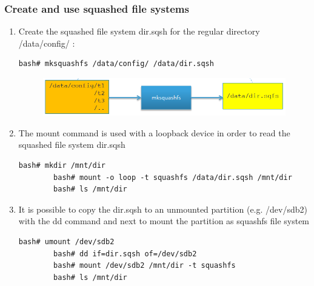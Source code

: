 \documentclass[resume]{subfiles}
\begin{document}
\subsubsection{Create and use squashed file systems}
\begin{enumerate}
    \item Create the squashed file system dir.sqsh for the regular directory /data/config/ :
    \begin{lstlisting}[style=console,label={},caption={}]
        bash# mksquashfs /data/config/ /data/dir.sqsh
    \end{lstlisting}
    \begin{figure}[H]
        \centering
        \includegraphics[width=0.75\columnwidth]{Figures/fileSystem/msquashfsCom.png}
        \label{fig:msquashfsCom}
    \end{figure}
    \item The mount command is used with a loopback device in order to read the squashed file system dir.sqsh
    \begin{lstlisting}[style=console,label={},caption={}]
        bash# mkdir /mnt/dir
        bash# mount -o loop -t squashfs /data/dir.sqsh /mnt/dir
        bash# ls /mnt/dir
    \end{lstlisting}
    \item It is possible to copy the dir.sqsh to an unmounted partition (e.g. /dev/sdb2) with the dd command and next to mount the partition as squashfs file system
    \begin{lstlisting}[style=console,label={},caption={}]
        bash# umount /dev/sdb2
        bash# dd if=dir.sqsh of=/dev/sdb2
        bash# mount /dev/sdb2 /mnt/dir -t squashfs
        bash# ls /mnt/dir
    \end{lstlisting}
\end{enumerate}
\end{document}
